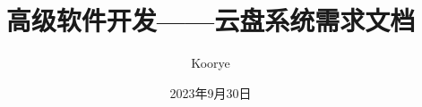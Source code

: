 \documentclass{article}
\title{高级软件开发——云盘系统需求文档}
\author{Koorye}
\date{2023年9月30日}
\begin{document}
\begin{titlepage}
\maketitle
\end{titlepage}

\tableofcontents
\newpage








\end{document}
